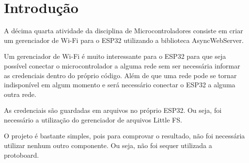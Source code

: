 \section{Introdução}

A décima quarta atividade da disciplina de Microcontroladores consiste em criar um gerenciador de Wi-Fi para o ESP32 utilizando a biblioteca AsyncWebServer.

Um gerenciador de Wi-Fi é muito interessante para o ESP32 para que seja possível conectar o microcontrolador a alguma rede sem ser necessária informar as credenciais dentro do próprio código. Além de que uma rede pode se tornar indisponível em algum momento e será necessário conectar o ESP32 a alguma outra rede.

As credenciais são guardadas em arquivos no próprio ESP32. Ou seja, foi necessário a utilização do gerenciador de arquivos Little FS.

O projeto é bastante simples, pois para comprovar o resultado, não foi necessária utilizar nenhum outro componente. Ou seja, não foi sequer utilizada a protoboard.
